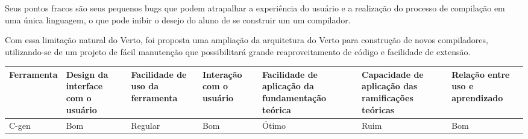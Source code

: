 Seus pontos fracos são seus pequenos bugs que podem atrapalhar a experiência do usuário e
a realização do processo de compilação em uma única linguagem, o que pode inibir o 
desejo do aluno de se construir um um compilador.

Com essa limitação natural do Verto, foi proposta uma ampliação da
arquitetura do Verto para construção de novos compiladores, utilizando-se de
um projeto de fácil manutenção que possibilitará grande reaproveitamento de código e
facilidade de extensão.

\begin{tabular}{|m{1.6cm}|m{1.5cm}|m{1.5cm}|m{1.5cm}|m{1.5cm}|m{1.8cm}|m{1.5cm}|}  \hline
   Ferramenta & Design da interface com o usuário & Facilidade de uso da ferramenta & Interação com o usuário & Facilidade de aplicação da fundamentação teórica & Capacidade de aplicação das ramificações teóricas & Relação entre uso e aprendizado \\ \hline
C-gen & Bom & Regular & Bom & Ótimo & Ruim & Bom \\ \hline
\end{tabular}



